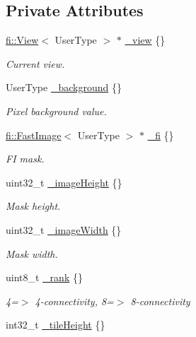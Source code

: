 \subsection*{Private Attributes}
\begin{DoxyCompactItemize}
\item 
\hyperlink{classfi_1_1View}{fi\+::\+View}$<$ User\+Type $>$ $\ast$ \hyperlink{classfc_1_1ViewAnalyser_a1ecb72188337c5dd826fb6abd76c7bb0}{\+\_\+view} \{\}
\begin{DoxyCompactList}\small\item\em Current view. \end{DoxyCompactList}\item 
User\+Type \hyperlink{classfc_1_1ViewAnalyser_a6dd17c2aa9f8a20889c61bd0edd62b60}{\+\_\+background} \{\}
\begin{DoxyCompactList}\small\item\em Pixel background value. \end{DoxyCompactList}\item 
\hyperlink{classfi_1_1FastImage}{fi\+::\+Fast\+Image}$<$ User\+Type $>$ $\ast$ \hyperlink{classfc_1_1ViewAnalyser_af9c2ea795ef1ead56c962847995044a1}{\+\_\+fi} \{\}
\begin{DoxyCompactList}\small\item\em FI mask. \end{DoxyCompactList}\item 
uint32\+\_\+t \hyperlink{classfc_1_1ViewAnalyser_a3df970fce554953cdf16d8ca79bd1f69}{\+\_\+image\+Height} \{\}
\begin{DoxyCompactList}\small\item\em Mask height. \end{DoxyCompactList}\item 
uint32\+\_\+t \hyperlink{classfc_1_1ViewAnalyser_abb6375bb2d391f0175ff0e433bf6904d}{\+\_\+image\+Width} \{\}
\begin{DoxyCompactList}\small\item\em Mask width. \end{DoxyCompactList}\item 
uint8\+\_\+t \hyperlink{classfc_1_1ViewAnalyser_a6c4eb5399fbe8920e3f2ca4dc794dbc6}{\+\_\+rank} \{\}
\begin{DoxyCompactList}\small\item\em 4=$>$ 4-\/connectivity, 8=$>$ 8-\/connectivity \end{DoxyCompactList}\item 
int32\+\_\+t \hyperlink{classfc_1_1ViewAnalyser_aaebba5c87fe2f3d6939ccd1c84a68510}{\+\_\+tile\+Height} \{\}

\end{DoxyCompactItemize}
